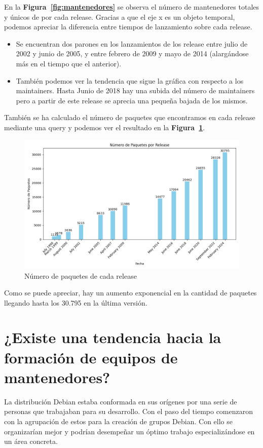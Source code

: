 \documentclass[a4paper, 12pt]{book}
\begin{document}
En la  \textbf{Figura~\ref{fig:mantenedores}} se observa el número de mantenedores totales y únicos de por cada release. 
Gracias a que el eje x es un objeto temporal, podemos apreciar la diferencia entre tiempos de lanzamiento sobre cada release.
	\begin{itemize}
	\item  Se encuentran dos parones en los lanzamientos de los release entre julio de 2002 y junio de 2005, y entre febrero de 2009 y mayo de 2014 (alargándose más en el tiempo que el anterior).
	
	\item También podemos ver la tendencia que sigue la gráfica con respecto a los maintainers. Hasta Junio de 2018 hay una subida del número de maintainers pero a partir de este release se aprecia una pequeña bajada de los mismos.
\end{itemize}

También se ha calculado el número de paquetes que encontramos en cada release mediante una query y podemos ver el resultado en la \textbf{Figura~\ref{fig:paquetes}}.

\begin{figure}
	\centering
	\includegraphics[width=15cm, keepaspectratio]{img/paquetes_releases.png}
	\caption{Número de paquetes de cada release}
	\label{fig:paquetes}
\end{figure}

Como se puede apreciar, hay un aumento exponencial en la cantidad de paquetes llegando hasta los 30.795 en la última versión.

\section{¿Existe una tendencia hacia la formación de equipos de mantenedores?}
\label{sec:pregunta_2}
La distribución Debian estaba conformada en sus orígenes por una serie de personas que trabajaban para su desarrollo. Con el paso del tiempo comenzaron con la agrupación de estos para la creación de grupos Debian. Con ello se organizarían mejor y podrían desempeñar un óptimo trabajo especializándose en un área concreta.
\end{document}
